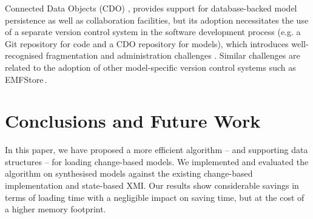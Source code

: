 \documentclass{llncs}
\begin{document}
Connected Data Objects (CDO) \cite{eclipse2017cdo}, provides support for database-backed model persistence as well as collaboration facilities, but its adoption necessitates the use of a separate version control system in the software development process (e.g. a Git repository for code and a CDO repository for models), which introduces well-recognised fragmentation and administration challenges \cite{barmpis2014evaluation}. Similar challenges are related to the adoption of other model-specific version control systems such as EMFStore\,\cite{koegel2010emfstore}.




\section{Conclusions and Future Work}
\label{sec:conclusions}
In this paper, we have proposed a more efficient algorithm -- and supporting data structures -- for loading change-based models.
We implemented and evaluated the algorithm on synthesised models against the existing change-based implementation and state-based XMI. 
Our results show considerable savings in terms of loading time with a negligible impact on saving time, but at the cost of a higher memory footprint.
\end{document}
